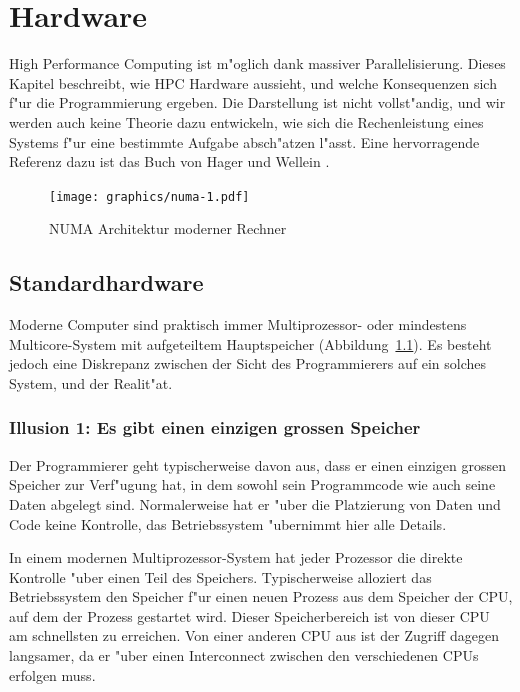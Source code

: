 \chapter{Hardware\label{chapter-hardware}}
\rhead{}
High Performance Computing ist m"oglich dank massiver Parallelisierung.
Dieses Kapitel beschreibt, wie HPC Hardware aussieht, und welche Konsequenzen
sich f"ur die Programmierung ergeben.
Die Darstellung ist nicht vollst"andig, und wir werden auch keine
Theorie dazu entwickeln, wie sich die Rechenleistung eines Systems
f"ur eine bestimmte Aufgabe absch"atzen l"asst.
Eine hervorragende Referenz dazu ist das Buch von Hager und Wellein
\cite{skript:hagerwellein}.
\begin{figure}
\begin{center}
\texttt{[image: graphics/numa-1.pdf]}
\end{center}
\caption{NUMA Architektur moderner Rechner
\label{numa}}
\end{figure}

\section{Standardhardware}
Moderne Computer sind praktisch immer Multiprozessor- oder mindestens
Multicore-System mit aufgeteiltem Hauptspeicher (Abbildung~\ref{numa}).
Es besteht jedoch eine Diskrepanz zwischen der Sicht des Programmierers
auf ein solches System, und der Realit"at.

\subsection{Illusion 1: Es gibt einen einzigen grossen Speicher}
Der Programmierer geht typischerweise davon aus, dass er einen einzigen
grossen Speicher zur Verf"ugung hat, in dem sowohl sein Programmcode
wie auch seine Daten abgelegt sind.
Normalerweise hat er "uber die Platzierung von Daten und Code keine
Kontrolle, das Betriebssystem "ubernimmt hier alle Details.

In einem modernen Multiprozessor-System hat jeder Prozessor die direkte
Kontrolle "uber einen Teil des Speichers. Typischerweise alloziert das
Betriebssystem den Speicher f"ur einen neuen Prozess aus dem Speicher
der CPU, auf dem der Prozess gestartet wird.
Dieser Speicherbereich ist von dieser CPU am schnellsten zu erreichen.
Von einer anderen CPU aus ist der Zugriff dagegen langsamer, da er 
"uber einen Interconnect zwischen den verschiedenen CPUs erfolgen muss.

